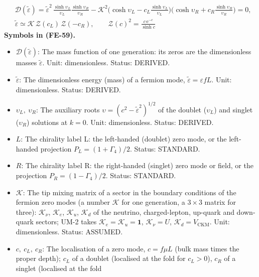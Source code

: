 \documentclass[
  10pt,
]{article}
\providecommand{\tightlist}{%
  \setlength{\itemsep}{0pt}\setlength{\parskip}{0pt}}
\begin{document}
\[
\begin{aligned}
&\mathcal{D}(\tilde\varepsilon) =
 \tilde\varepsilon^2\,\frac{\sinh\upsilon_L}{\upsilon_L}\frac{\sinh\upsilon_R}{\upsilon_R}
 - \mathcal{K}^2\Big(\cosh\upsilon_L - c_L\frac{\sinh\upsilon_L}{\upsilon_L}\Big)
 \Big(\cosh\upsilon_R + c_R\frac{\sinh\upsilon_R}{\upsilon_R}\Big) = 0,\\
&\tilde\varepsilon \simeq \mathcal{K}\,\mathcal{Z}(c_L)\,\mathcal{Z}(-c_R),\qquad \mathcal{Z}(c)^2 =
 \frac{c\,\mathrm{e}^{-c}}{\sinh c}
\end{aligned} \tag{FE-59}
\] \textbf{Symbols in (FE-59).}

\begin{itemize}
\tightlist
\item
  \(\mathcal{D}(\tilde\varepsilon)\): The mass function of one
  generation: its zeros are the dimensionless masses
  \(\tilde\varepsilon\). Unit: dimensionless. Status: DERIVED.
\item
  \(\tilde\varepsilon\): The dimensionless energy (mass) of a fermion
  mode, \(\tilde\varepsilon = \varepsilon fL\). Unit: dimensionless.
  Status: DERIVED.
\item
  \(\upsilon_L,\ \upsilon_R\): The auxiliary roots
  \(\upsilon = (c^2 - \tilde\varepsilon^2)^{1/2}\) of the doublet
  (\(\upsilon_L\)) and singlet (\(\upsilon_R\)) solutions at \(k = 0\).
  Unit: dimensionless. Status: DERIVED.
\item
  \(L\): The chirality label L: the left-handed (doublet) zero mode, or
  the left-handed projection \(P_L = (1 + \Gamma_4)/2\). Status:
  STANDARD.
\item
  \(R\): The chirality label R: the right-handed (singlet) zero mode or
  field, or the projection \(P_R = (1 - \Gamma_4)/2\). Status: STANDARD.
\item
  \(\mathcal{K}\): The tip mixing matrix of a sector in the boundary
  conditions of the fermion zero modes (a number \(\mathcal{K}\) for one
  generation, a \(3 \times 3\) matrix for three): \(\mathcal{K}_\nu\),
  \(\mathcal{K}_e\), \(\mathcal{K}_u\), \(\mathcal{K}_d\) of the
  neutrino, charged-lepton, up-quark and down-quark sectors; UM-2 takes
  \(\mathcal{K}_e = \mathcal{K}_u = \mathbf{1}\),
  \(\mathcal{K}_\nu = U\), \(\mathcal{K}_d = V_{\mathrm{CKM}}\). Unit:
  dimensionless. Status: ASSUMED.
\item
  \(c,\ c_L,\ c_R\): The localisation of a zero mode, \(c = f\mu L\)
  (bulk mass times the proper depth); \(c_L\) of a doublet (localised at
  the fold for \(c_L > 0\)), \(c_R\) of a singlet (localised at the fold

\end{itemize}
\end{document}

